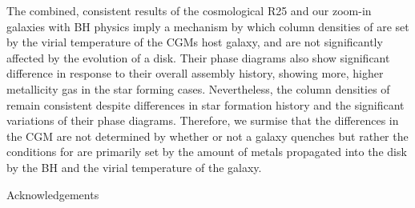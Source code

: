 \documentclass[]{emulateapj}
\begin{document}
The combined, consistent results of the cosmological R25 and our zoom-in galaxies with BH physics imply a mechanism by which column densities of  are set by the virial temperature of the CGMs host galaxy, and are not significantly affected by the evolution of a disk. Their phase diagrams also show significant difference in response to their overall assembly history, showing more, higher metallicity gas in the star forming cases. Nevertheless, the column densities of  remain consistent despite differences in star formation history and the significant variations of their phase diagrams. Therefore, we surmise that the differences in the CGM are not determined by whether or not a galaxy quenches but rather the conditions for  are primarily set by the amount of metals propagated into the disk by the BH and the virial temperature of the galaxy.



\acknowledgments
Acknowledgements


\end{document}
